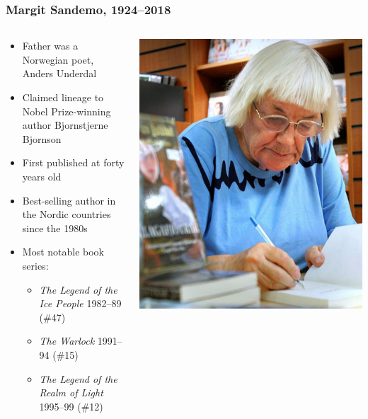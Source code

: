 \begin{frame}
    \frametitle{Margit Sandemo, 1924--2018}
    \begin{columns}[T]
        \begin{column}{0.55\textwidth}
            \begin{itemize}
                \item Father was a Norwegian poet, Anders Underdal
                \item Claimed lineage to Nobel Prize-winning author Bjornstjerne Bjornson
                \item First published at forty years old
                \item Best-selling author in the Nordic countries since the 1980s
                \item Most notable book series:
                \begin{itemize}
                    \item \emph{The Legend of the Ice People} 1982--89 (\#47)
                    \item \emph{The Warlock} 1991--94 (\#15)
                    \item \emph{The Legend of the Realm of Light} 1995--99 (\#12)
                \end{itemize}
            \end{itemize}
        \end{column}
        \begin{column}{0.45\textwidth}
            \centering
            \includegraphics[width=\textwidth]{../figures/margit_sandemo}
        \end{column}
    \end{columns}
\end{frame}

